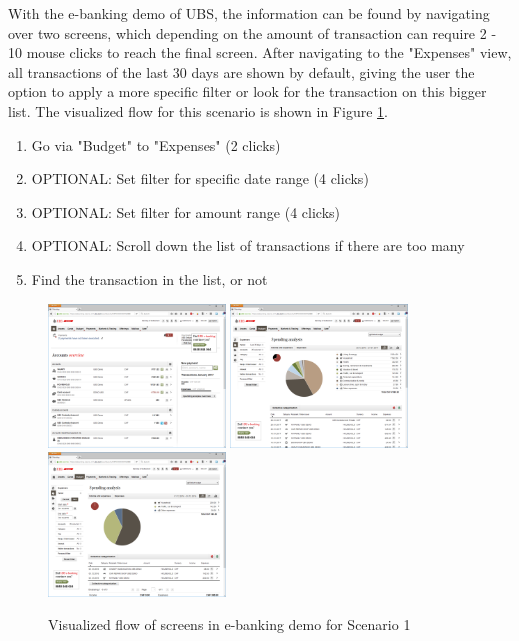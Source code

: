With the e-banking demo of UBS, the information can be found by navigating over two screens, which depending on the amount of transaction can require 2 - 10 mouse clicks to reach the final screen. After navigating to the "Expenses" view, all transactions of the last 30 days are shown by default, giving the user the option to apply a more specific filter or look for the transaction on this bigger list. The visualized flow for this scenario is shown in Figure \ref{fig:scenariooneebanking}.
\begin{enumerate}
	\item Go via "Budget" to "Expenses" (2 clicks)
	\item OPTIONAL: Set filter for specific date range (4 clicks)
	\item OPTIONAL: Set filter for amount range (4 clicks)
	\item OPTIONAL: Scroll down the list of transactions if there are too many
	\item Find the transaction in the list, or not
\end{enumerate}
\begin{figure}[h]
	\begin{center}
		\includegraphics[width=4.7cm]{03_Figures/09_Evaluation/UBS_1_Overview.png}
		\includegraphics[width=4.7cm]{03_Figures/09_Evaluation/UBS_2_SpendingAnalysis.png}
		\includegraphics[width=4.7cm]{03_Figures/09_Evaluation/UBS_2_SpendingAnalysis_Filter.png}
		\caption{Visualized flow of screens in e-banking demo for Scenario 1}
		\label{fig:scenariooneebanking}
	\end{center}
\end{figure}


